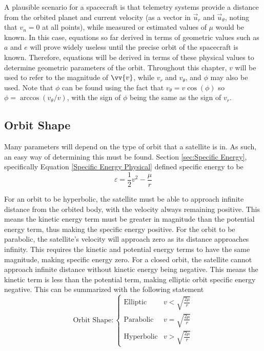 \documentclass[../basicOrbitalDynamics.tex]{subfiles}
\begin{document}
A plausible scenario for a spacecraft is that telemetry systems provide a distance from the orbited planet and current velocity (as a vector in $\vec{u}_r$ and $\vec{u}_\theta$, noting that $v_n=0$ at all points), while measured or estimated values of $\mu$ would be known. In this case, equations so far derived in terms of geometric values such as $a$ and $e$ will prove widely useless until the precise orbit of the spacecraft is known. Therefore, equations will be derived in terms of these physical values to determine geometric parameters of the orbit. Throughout this chapter, $v$ will be used to refer to the magnitude of $\vv{v}$, while $v_r$ and $v_\theta$, and $\phi$ may also be used. Note that $\phi$ can be found using the fact that $v_\theta=v\cos(\phi)$ so $\phi=\arccos(v_\theta/v)$, with the sign of $\phi$ being the same as the sign of $v_r$.

\bigskip\bigskip
\subsection{Orbit Shape}

Many parameters will depend on the type of orbit that a satellite is in. As such, an easy way of determining this must be found. Section \ref{sec:Specific Energy}, specifically Equation \eqref{Specific Energy Physical} defined specific energy to be
$$\varepsilon=\frac{1}{2}v^2-\frac{\mu}{r}$$

For an orbit to be hyperbolic, the satellite must be able to approach infinite distance from the orbited body, with the velocity always remaining positive. This means the kinetic energy term must be greater in magnitude than the potential energy term, thus making the specific energy positive. For the orbit to be parabolic, the satellite's velocity will approach zero as its distance approaches infinity. This requires the kinetic and potential energy terms to have the same magnitude, making specific energy zero. For a closed orbit, the satellite cannot approach infinite distance without kinetic energy being negative. This means the kinetic term is less than the potential term, making elliptic orbit specific energy negative. This can be summarized with the following statement
\begin{equation}\label{Orbit Shape Physical}
    \text{Orbit Shape}: \begin{cases}
        \text{Elliptic}   & v<\sqrt{\frac{2\mu}{r}} \\
        \text{Parabolic}  & v=\sqrt{\frac{2\mu}{r}} \\
        \text{Hyperbolic} & v>\sqrt{\frac{2\mu}{r}}
    \end{cases}
\end{equation}
\end{document}
